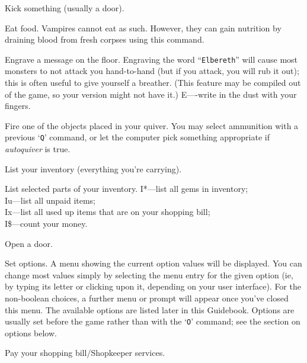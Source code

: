 \item[\tb{\^{}{\rm D}}]
Kick something (usually a door).

\item[\tb{{\rm e}}]
Eat food. Vampires cannot eat as such. However, they can gain nutrition by
draining blood from fresh corpses using this command.

\item[\tb{{\rm E}}]
Engrave a message on the floor.
Engraving the word ``{\tt Elbereth}'' will cause most monsters to not attack
you hand-to-hand (but if you attack, you will rub it out); this is
often useful to give yourself a breather.  (This feature may be compiled out
of the game, so your version might not have it.)
E----write in the dust with your fingers.  

\item[\tb{{\rm f}}]
Fire one of the objects placed in your quiver.  You may select
ammunition with a previous `{\tt Q}' command, or let the computer pick
something appropriate if
{\it autoquiver\/} 
is true.

\item[\tb{{\rm i}}]
List your inventory (everything you're carrying).

\item[\tb{{\rm I}}]
List selected parts of your inventory.
I*---list all gems in inventory;\\
Iu---list all unpaid items;\\
Ix---list all used up items that are on your shopping bill;\\
I\$---count your money.

\item[\tb{{\rm o}}]
Open a door.

\item[\tb{{\rm O}}]
Set options.  A menu showing the current option values will be
displayed.  You can change most values simply by selecting the menu
entry for the given option (ie, by typing its letter or clicking upon
it, depending on your user interface).  For the non-boolean choices,
a further menu or prompt will appear once you've closed this menu.
The available options
are listed later in this Guidebook.  Options are usually set before the
game rather than with the `{\tt O}' command; see the section on options below.

\item[\tb{{\rm p}}]
Pay your shopping bill/Shopkeeper services.

